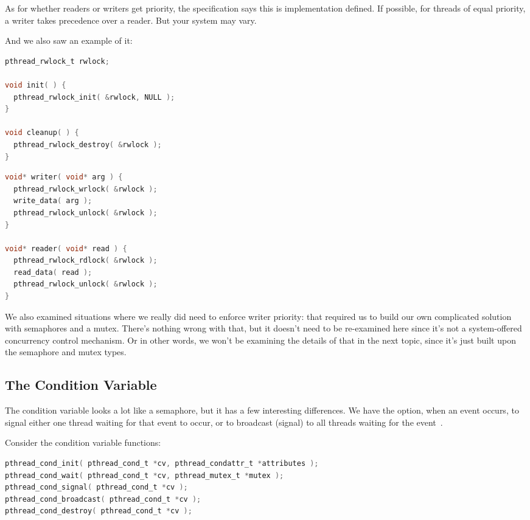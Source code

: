 As for whether readers or writers get priority, the specification says this is implementation defined. If possible, for threads of equal priority, a writer takes precedence over a reader. But your system may vary.

And we also saw an example of it: 
\begin{multicols}{2}
	\begin{lstlisting}[language=C]
pthread_rwlock_t rwlock;

void init( ) {
  pthread_rwlock_init( &rwlock, NULL );
}

void cleanup( ) {
  pthread_rwlock_destroy( &rwlock );
}
\end{lstlisting}

	\columnbreak

	\begin{lstlisting}[language=C]
void* writer( void* arg ) {
  pthread_rwlock_wrlock( &rwlock );
  write_data( arg );
  pthread_rwlock_unlock( &rwlock );
}

void* reader( void* read ) {
  pthread_rwlock_rdlock( &rwlock );
  read_data( read );
  pthread_rwlock_unlock( &rwlock );
}
\end{lstlisting}

\end{multicols}

We also examined situations where we really did need to enforce writer priority: that required us to build our own complicated solution with semaphores and a mutex. There's nothing wrong with that, but it doesn't need to be re-examined here since it's not a system-offered concurrency control mechanism. Or in other words, we won't be examining the details of that in the next topic, since it's just built upon the semaphore and mutex types.


\subsection*{The Condition Variable}

The condition variable looks a lot like a semaphore, but it has a few interesting differences. We have the option, when an event occurs, to signal either one thread waiting for that event to occur, or to broadcast (signal) to all threads waiting for the event~\cite{mte241}.

Consider the condition variable functions:

\begin{lstlisting}[language=C]
pthread_cond_init( pthread_cond_t *cv, pthread_condattr_t *attributes );
pthread_cond_wait( pthread_cond_t *cv, pthread_mutex_t *mutex );
pthread_cond_signal( pthread_cond_t *cv );
pthread_cond_broadcast( pthread_cond_t *cv );
pthread_cond_destroy( pthread_cond_t *cv );
\end{lstlisting}

